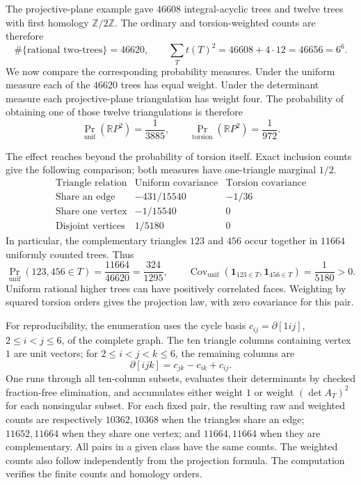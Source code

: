 \documentclass[11pt]{article}
\theoremstyle{definition}
\theoremstyle{remark}
\newcommand{\Z}{\mathbb Z}
\newcommand{\R}{\mathbb R}
\begin{document}
The projective-plane example gave $46608$ integral-acyclic trees and
twelve trees with first homology $\Z/2\Z$. The ordinary and
torsion-weighted counts are therefore
\[
\#\{\text{rational two-trees}\}=46620,
\qquad
\sum_Tt(T)^2=46608+4\cdot12=46656=6^6.
\]
We now compare the corresponding probability measures. Under the uniform measure
each of the $46620$ trees has equal weight. Under the determinant measure
each projective-plane triangulation has weight four. The probability of
obtaining one of those twelve triangulations is therefore
\[
\Pr_{\mathrm{unif}}(\R P^2)=\frac1{3885},
\qquad
\Pr_{\mathrm{torsion}}(\R P^2)=\frac1{972}.
\]

The effect reaches beyond the probability of torsion itself. Exact
inclusion counts give the following comparison; both measures have
one-triangle marginal $1/2$.
\[
\begin{array}{lcc}
\text{Triangle relation}&\text{Uniform covariance}&\text{Torsion covariance}\\
\text{Share an edge}&-431/15540&-1/36\\
\text{Share one vertex}&-1/15540&0\\
\text{Disjoint vertices}&1/5180&0
\end{array}
\]
In particular, the complementary triangles $123$ and $456$ occur
together in $11664$ uniformly counted trees. Thus
\[
\Pr_{\mathrm{unif}}(123,456\in T)
=\frac{11664}{46620}
=\frac{324}{1295},
\qquad
\operatorname{Cov}_{\mathrm{unif}}
 (\mathbf1_{123\in T},\mathbf1_{456\in T})
=\frac1{5180}>0.
\]
Uniform rational higher trees can have positively correlated faces.
Weighting by squared torsion orders gives the projection law, with zero
covariance for this pair.

For reproducibility, the enumeration uses the cycle basis
$c_{ij}=\partial[1ij]$, $2\leq i<j\leq6$, of the complete graph.
The ten triangle columns containing vertex $1$ are unit vectors;
for $2\leq i<j<k\leq6$, the remaining columns are
\[
\partial[ijk]=c_{jk}-c_{ik}+c_{ij}.
\]
One runs through all ten-column subsets, evaluates their determinants
by checked fraction-free elimination, and accumulates either weight
$1$ or weight $(\det A_T)^2$ for each nonsingular subset. For each fixed
pair, the resulting raw and weighted counts are respectively
$10362,10368$ when the triangles share an edge;
$11652,11664$ when they share one vertex; and $11664,11664$ when they
are complementary. All pairs in a given class have the same counts.
The weighted counts also follow independently from the projection
formula. The computation verifies the finite counts and homology orders.
\end{document}
